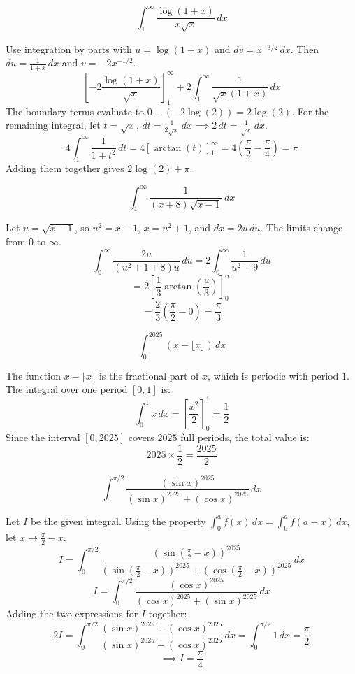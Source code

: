 \begin{questions}
    \question \[\int_1^\infty \frac{\log(1 + x)}{x\sqrt{x}} \,dx\]
    \begin{solution}
        Use integration by parts with $u = \log(1+x)$ and $dv = x^{-3/2}\,dx$. Then $du = \frac{1}{1+x}\,dx$ and $v = -2x^{-1/2}$.
        \[\left[ -2\frac{\log(1+x)}{\sqrt{x}} \right]_1^\infty + 2 \int_1^\infty \frac{1}{\sqrt{x}(1+x)} \,dx\]
        The boundary terms evaluate to $0 - (-2\log(2)) = 2\log(2)$.
        For the remaining integral, let $t = \sqrt{x}$, $dt = \frac{1}{2\sqrt{x}}\,dx \implies 2\,dt = \frac{1}{\sqrt{x}}\,dx$.
        \[4 \int_1^\infty \frac{1}{1+t^2} \,dt = 4 [\arctan(t)]_1^\infty = 4\left(\frac{\pi}{2} - \frac{\pi}{4}\right) = \pi\]
        Adding them together gives $2\log(2) + \pi$.
    \end{solution}

    \question \[\int_1^\infty \frac{1}{(x+8)\sqrt{x-1}} \,dx\]
    \begin{solution}
        Let $u = \sqrt{x-1}$, so $u^2 = x-1$, $x = u^2+1$, and $dx = 2u \,du$. The limits change from $0$ to $\infty$.
        \[\int_0^\infty \frac{2u}{(u^2+1+8)u} \,du = 2 \int_0^\infty \frac{1}{u^2+9} \,du\]
        \[= 2 \left[ \frac{1}{3}\arctan\left(\frac{u}{3}\right) \right]_0^\infty\]
        \[= \frac{2}{3} \left( \frac{\pi}{2} - 0 \right) = \frac{\pi}{3}\]
    \end{solution}

    \question \[\int_0^{2025} (x - \lfloor x \rfloor) \,dx\]
    \begin{solution}
        The function $x - \lfloor x \rfloor$ is the fractional part of $x$, which is periodic with period $1$. 
        The integral over one period $[0,1]$ is:
        \[\int_0^1 x \,dx = \left[ \frac{x^2}{2} \right]_0^1 = \frac{1}{2}\]
        Since the interval $[0, 2025]$ covers $2025$ full periods, the total value is:
        \[2025 \times \frac{1}{2} = \frac{2025}{2}\]
    \end{solution}

    \question \[\int_0^{\pi/2} \frac{(\sin x)^{2025}}{(\sin x)^{2025} + (\cos x)^{2025}} \,dx\]
    \begin{solution}
        Let $I$ be the given integral. Using the property $\int_0^a f(x) \,dx = \int_0^a f(a-x) \,dx$, let $x \to \frac{\pi}{2} - x$.
        \[I = \int_0^{\pi/2} \frac{(\sin(\frac{\pi}{2}-x))^{2025}}{(\sin(\frac{\pi}{2}-x))^{2025} + (\cos(\frac{\pi}{2}-x))^{2025}} \,dx\]
        \[I = \int_0^{\pi/2} \frac{(\cos x)^{2025}}{(\cos x)^{2025} + (\sin x)^{2025}} \,dx\]
        Adding the two expressions for $I$ together:
        \[2I = \int_0^{\pi/2} \frac{(\sin x)^{2025} + (\cos x)^{2025}}{(\sin x)^{2025} + (\cos x)^{2025}} \,dx = \int_0^{\pi/2} 1 \,dx = \frac{\pi}{2}\]
        \[\implies I = \frac{\pi}{4}\]
    \end{solution}


\end{questions}
